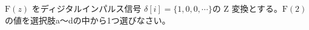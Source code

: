 $\textrm{F}(z)$ をディジタルインパルス信号 $\delta[i] = \{1,0,0,\cdots \}$の Z 変換とする。$\textrm{F}(2)$ の値を選択肢a〜dの中から1つ選びなさい。
